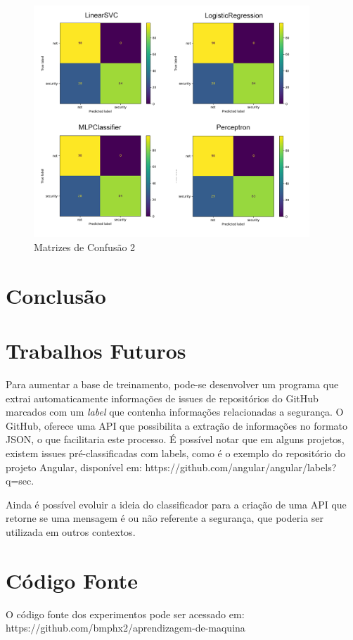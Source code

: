 \documentclass[conference]{IEEEtran}
\begin{document}
\begin{figure}[htbp]
    \centerline{\includegraphics[width=28em]{images/conf_mat_2.png}}
    \caption{Matrizes de Confusão 2}
    \label{fig:conf_mat_2}
\end{figure}

\section{Conclusão}

\section{Trabalhos Futuros}

Para aumentar a base de treinamento, pode-se desenvolver um programa que extrai automaticamente informações de issues de repositórios do GitHub marcados com um \textit{label} que contenha informações relacionadas a segurança. O GitHub, oferece uma API que possibilita a extração de informações no formato JSON, o que facilitaria este processo. É possível notar que em alguns projetos, existem issues pré-classificadas com labels, como é o exemplo do repositório do projeto Angular, disponível em: https://github.com/angular/angular/labels?q=sec.

Ainda é possível evoluir a ideia do classificador para a criação de uma API que retorne se uma mensagem é ou não referente a segurança, que poderia ser utilizada em outros contextos.

\section{Código Fonte}

O código fonte dos experimentos pode ser acessado em: https://github.com/bmphx2/aprendizagem-de-maquina



\end{document}
